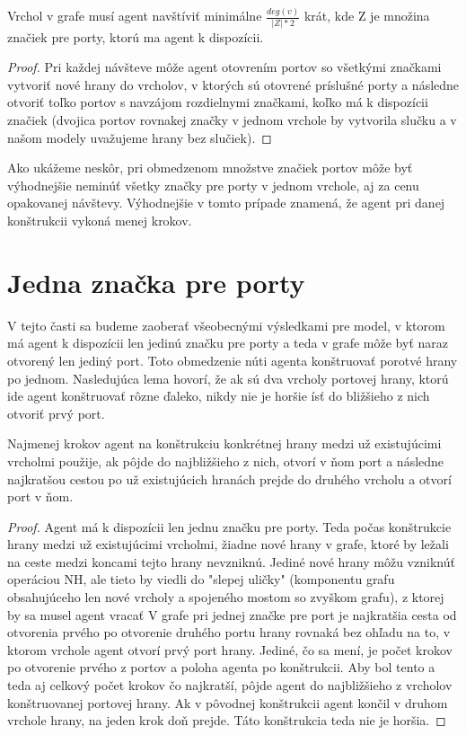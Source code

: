 \begin{lem}
Vrchol v grafe musí agent navštíviť minimálne $\frac{deg(v)}{|Z| * 2} $ krát,
kde Z je množina značiek pre porty, ktorú ma agent k dispozícii.
\end{lem}
\begin{proof}
Pri každej návšteve môže agent otovrením portov so všetkými značkami 
vytvoriť nové hrany do vrcholov, v ktorých sú otovrené príslušné porty 
a následne otvoriť toľko
portov s navzájom rozdielnymi značkami, koľko má k dispozícii značiek
(dvojica portov rovnakej značky v jednom vrchole by vytvorila slučku a v
našom modely uvažujeme hrany bez slučiek).
\end{proof}

Ako ukážeme neskôr, pri obmedzenom množstve značiek portov môže byť
výhodnejšie neminúť všetky značky pre porty v jednom vrchole, aj za cenu
opakovanej návštevy. Výhodnejšie v tomto prípade znamená, že agent pri danej
konštrukcii vykoná menej krokov.



\section{Jedna značka pre porty}
V tejto časti sa budeme zaoberať všeobecnými výsledkami pre model, v ktorom
má agent k dispozícii len jedinú značku pre porty a teda v grafe môže byť
naraz otvorený len jediný port. Toto obmedzenie núti agenta konštruovať
porotvé hrany po jednom. Nasledujúca lema hovorí, že ak sú dva vrcholy
portovej hrany, ktorú ide agent konštruovať rôzne ďaleko, nikdy nie je
horšie ísť do bližšieho z nich otvoriť prvý port.


\begin{lem}
Najmenej krokov agent na konštrukciu konkrétnej hrany medzi už existujúcimi
vrcholmi použije, ak pôjde do najbližšieho z nich, otvorí v ňom port a
následne najkratšou cestou po už existujúcich hranách prejde do druhého
vrcholu a otvorí port v ňom.
\end{lem}
\begin{proof}
Agent má k dispozícii len jednu značku pre porty. Teda počas konštrukcie
hrany medzi už existujúcimi vrcholmi, žiadne nové hrany v grafe,
 ktoré by ležali na ceste medzi koncami tejto hrany nevzniknú.
 Jediné nové hrany môžu vzniknúť operáciou NH, ale
tieto by viedli do "slepej uličky" (komponentu grafu obsahujúceho len nové
vrcholy a spojeného mostom so zvyškom grafu), z ktorej by sa musel agent vracať 
V grafe
pri jednej značke pre port je najkratšia cesta od otvorenia prvého po
otvorenie druhého portu hrany rovnaká bez ohľadu na to, 
v ktorom vrchole agent otvorí prvý port hrany.
Jediné, čo sa mení, je počet krokov po otvorenie prvého z portov a poloha
agenta po konštrukcii.
Aby bol tento a teda aj celkový počet krokov čo najkratší, pôjde agent do
najbližšieho z vrcholov konštruovanej portovej hrany. Ak v pôvodnej
konštrukcii agent končil v druhom vrchole hrany, na jeden krok doň prejde.
Táto konštrukcia teda nie je horšia.
\end{proof}

